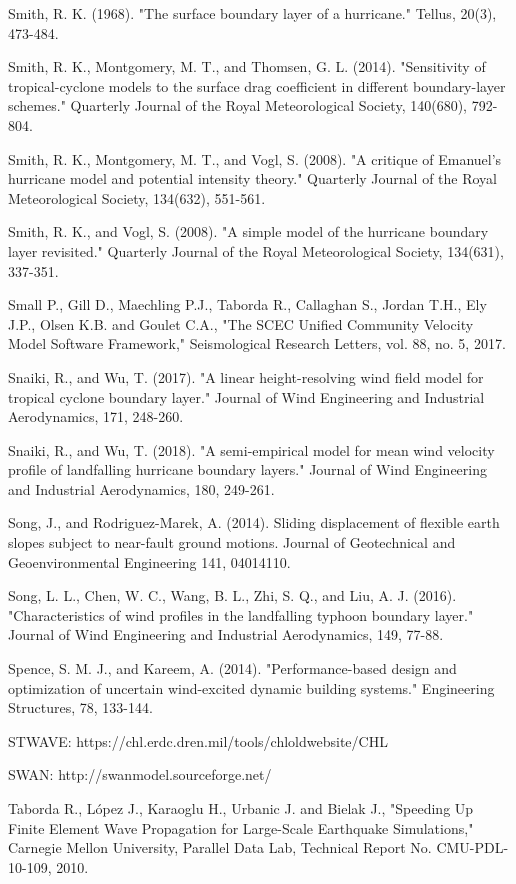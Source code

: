 Smith, R. K. (1968). "The surface boundary layer of a hurricane." Tellus, 20(3), 473-484.

Smith, R. K., Montgomery, M. T., and Thomsen, G. L. (2014). "Sensitivity of tropical-cyclone models to the surface drag coefficient in different boundary-layer schemes." Quarterly Journal of the Royal Meteorological Society, 140(680), 792-804.

Smith, R. K., Montgomery, M. T., and Vogl, S. (2008). "A critique of Emanuel's hurricane model and potential intensity theory." Quarterly Journal of the Royal Meteorological Society, 134(632), 551-561.

Smith, R. K., and Vogl, S. (2008). "A simple model of the hurricane boundary layer revisited." Quarterly Journal of the Royal Meteorological Society, 134(631), 337-351.

Small P., Gill D., Maechling P.J., Taborda R., Callaghan S., Jordan T.H., Ely J.P., Olsen K.B. and Goulet C.A., "The SCEC Unified Community Velocity Model Software Framework," Seismological Research Letters, vol. 88, no. 5, 2017.

Snaiki, R., and Wu, T. (2017). "A linear height-resolving wind field model for tropical cyclone boundary layer." Journal of Wind Engineering and Industrial Aerodynamics, 171, 248-260.

Snaiki, R., and Wu, T. (2018). "A semi-empirical model for mean wind velocity profile of landfalling hurricane boundary layers." Journal of Wind Engineering and Industrial Aerodynamics, 180, 249-261.

Song, J., and Rodriguez-Marek, A. (2014). Sliding displacement of flexible earth slopes subject to near-fault ground motions. Journal of Geotechnical and Geoenvironmental Engineering 141, 04014110.

Song, L. L., Chen, W. C., Wang, B. L., Zhi, S. Q., and Liu, A. J. (2016). "Characteristics of wind profiles in the landfalling typhoon boundary layer." Journal of Wind Engineering and Industrial Aerodynamics, 149, 77-88.

Spence, S. M. J., and Kareem, A. (2014). "Performance-based design and optimization of uncertain wind-excited dynamic building systems." Engineering Structures, 78, 133-144.

STWAVE: https://chl.erdc.dren.mil/tools/chloldwebsite/CHL%

SWAN: http://swanmodel.sourceforge.net/

Taborda R., López J., Karaoglu H., Urbanic J. and Bielak J., "Speeding Up Finite Element Wave Propagation for Large-Scale Earthquake Simulations," Carnegie Mellon University, Parallel Data Lab, Technical Report No. CMU-PDL-10-109, 2010.

